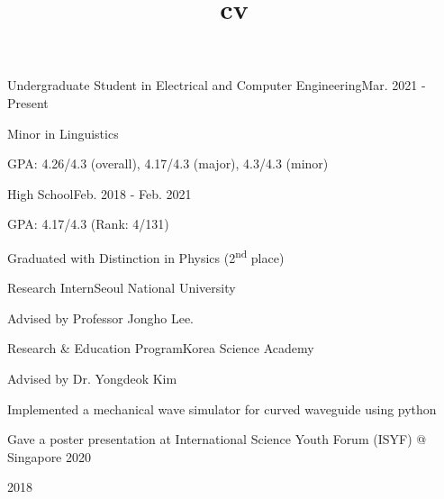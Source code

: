 \documentclass{cv}
\title{cv}
\begin{document}
\cvheader






{Undergraduate Student in Electrical and Computer Engineering}{Mar. 2021 - Present}
{
    \item Minor in Linguistics
    \item GPA: 4.26/4.3 (overall), 4.17/4.3 (major), 4.3/4.3 (minor)
}
{High School}{Feb. 2018 - Feb. 2021}
{
    \item GPA: 4.17/4.3 (Rank: 4/131) 
    \item Graduated with Distinction in Physics (2\textsuperscript{nd} place)
}


{Research Intern}{Seoul National University}
{
    \item Advised by Professor Jongho Lee.
}

{Research \& Education Program}{Korea Science Academy}
{
    \item Advised by Dr. Yongdeok Kim
    \item Implemented a mechanical wave simulator for curved waveguide using python %
    \item Gave a poster presentation at International Science Youth Forum (ISYF) @ Singapore 2020
}



 {2018}

\vspace{-4mm}
\end{document}
